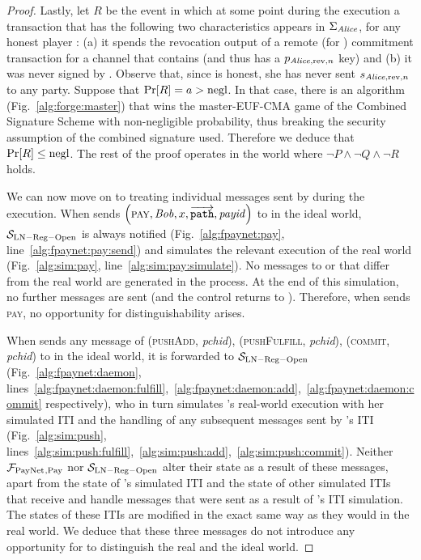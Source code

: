 \begin{proof}
  Lastly, let $R$ be the event in which at some point during the execution a
  transaction that has the following two characteristics appears in
  $\Sigma_{\mathit{Alice}}$, for any honest player \alice: (a) it spends the revocation
  output of a remote (for \alice{}) commitment transaction for a channel that
  contains \alice{} (and thus has a $p_{\mathit{Alice}, \mathrm{rev}, n}$ key) and (b)
  it was never signed by \alice. Observe that, since \alice{} is honest, she has
  never sent $s_{\mathit{Alice}, \mathrm{rev}, n}$ to any party. Suppose that $\Pr[R] =
  a > \text{negl}$. In that case, there is an algorithm (Fig.~\ref{alg:forge:master})
  that wins the \textsf{master-EUF-CMA} game of the Combined Signature Scheme
  with non-negligible probability, thus breaking the security assumption of the
  combined signature used. Therefore we deduce that $\Pr[R] \leq \text{negl}$. The
  rest of the proof operates in the world where $\neg P \wedge \neg Q \wedge
  \neg R$ holds.

  We can now move on to treating individual messages sent by \environment{}
  during the execution. When \environment{} sends $\left(\textsc{pay}, \mathit{Bob}, x,
  \overrightarrow{\mathtt{path}}, \mathit{payid}\right)$ to \alice{} in the
  ideal world, $\mathcal{S}_{\mathrm{LN - Reg - Open}}$ is always notified
  (Fig.~\ref{alg:fpaynet:pay}, line~\ref{alg:fpaynet:pay:send}) and simulates
  the relevant execution of the real world (Fig.~\ref{alg:sim:pay},
  line~\ref{alg:sim:pay:simulate}). No messages to \ledger{} or \environment{}
  that differ from the real world are generated in the process. At the end of
  this simulation, no further messages are sent (and the control returns to
  \environment). Therefore, when \environment{} sends \textsc{pay}, no
  opportunity for distinguishability arises.

  When \environment{} sends any message of (\textsc{pushAdd}, \textit{pchid}),
  (\textsc{pushFulfill}, \textit{pchid}), (\textsc{commit}, \textit{pchid}) to
  \alice{} in the ideal world, it is forwarded to $\mathcal{S}_{\mathrm{LN - Reg
  - Open}}$ (Fig.~\ref{alg:fpaynet:daemon},
  lines~\ref{alg:fpaynet:daemon:fulfill},~\ref{alg:fpaynet:daemon:add},~\ref{alg:fpaynet:daemon:commit}
  respectively), who in turn simulates \alice's real-world execution with her
  simulated ITI and the handling of any subsequent messages sent by \alice's ITI
  (Fig.~\ref{alg:sim:push},
  lines~\ref{alg:sim:push:fulfill},~\ref{alg:sim:push:add},~\ref{alg:sim:push:commit}).
  Neither $\mathcal{F}_{\mathrm{PayNet}}{}_{\mathrm{, Pay}}$ nor $\mathcal{S}_{\mathrm{LN - Reg -
  Open}}$ alter their state as a result of these messages, apart from the state
  of \alice's simulated ITI and the state of other simulated ITIs that receive
  and handle messages that were sent as a result of \alice's ITI simulation. The
  states of these ITIs are modified in the exact same way as they would in the
  real world. We deduce that these three messages do not introduce any
  opportunity for \environment{} to distinguish the real and the ideal world.


\end{proof}
